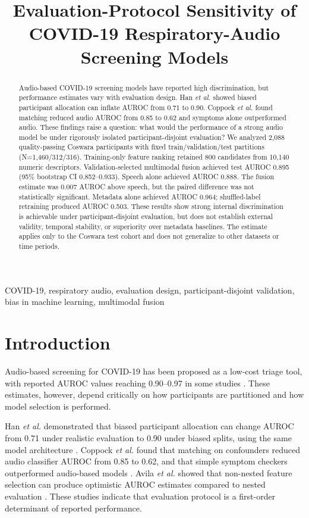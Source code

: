 \documentclass[conference]{IEEEtran}
\title{Evaluation-Protocol Sensitivity of COVID-19 Respiratory-Audio Screening Models}
\author{
\IEEEauthorblockN{Nishant Harkut and Ritu Tiwari}
\IEEEauthorblockA{Department of Information Technology\\
Atal Bihari Vajpayee Indian Institute of Information Technology and Management\\
Gwalior, India}
}
\begin{document}
\maketitle

\begin{abstract}
Audio-based COVID-19 screening models have reported high discrimination, but performance estimates vary with evaluation design. Han \emph{et al.} showed biased participant allocation can inflate AUROC from 0.71 to 0.90. Coppock \emph{et al.} found matching reduced audio AUROC from 0.85 to 0.62 and symptoms alone outperformed audio. These findings raise a question: what would the performance of a strong audio model be under rigorously isolated participant-disjoint evaluation? We analyzed 2,088 quality-passing Coswara participants with fixed train/validation/test partitions (N=1,460/312/316). Training-only feature ranking retained 800 candidates from 10,140 numeric descriptors. Validation-selected multimodal fusion achieved test AUROC 0.895 (95\% bootstrap CI 0.852--0.933). Speech alone achieved AUROC 0.888. The fusion estimate was 0.007 AUROC above speech, but the paired difference was not statistically significant. Metadata alone achieved AUROC 0.964; shuffled-label retraining produced AUROC 0.503. These results show strong internal discrimination is achievable under participant-disjoint evaluation, but does not establish external validity, temporal stability, or superiority over metadata baselines. The estimate applies only to the Coswara test cohort and does not generalize to other datasets or time periods.
\end{abstract}

\begin{IEEEkeywords}
COVID-19, respiratory audio, evaluation design, participant-disjoint validation, bias in machine learning, multimodal fusion
\end{IEEEkeywords}

\section{Introduction}

Audio-based screening for COVID-19 has been proposed as a low-cost triage tool, with reported AUROC values reaching 0.90--0.97 in some studies \cite{laguarta2020cough,bhattacharya2023coswara,aytekin2024hst}. These estimates, however, depend critically on how participants are partitioned and how model selection is performed.

Han \emph{et al.} demonstrated that biased participant allocation can change AUROC from 0.71 under realistic evaluation to 0.90 under biased splits, using the same model architecture \cite{han2022realistic}. Coppock \emph{et al.} found that matching on confounders reduced audio classifier AUROC from 0.85 to 0.62, and that simple symptom checkers outperformed audio-based models \cite{coppock2024audio}. Avila \emph{et al.} showed that non-nested feature selection can produce optimistic AUROC estimates compared to nested evaluation \cite{avila2021feature}. These studies indicate that evaluation protocol is a first-order determinant of reported performance.
\end{document}
